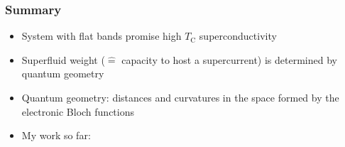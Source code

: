 \documentclass[aspectratio=169]{beamer}
\begin{document}

\begin{frame}
	\frametitle{Summary}
	
	\begin{itemize}
		\item System with flat bands promise high \(T_{\mathrm{C}}\) superconductivity\pause
		\item Superfluid weight (\(\hat{=}\) capacity to host a supercurrent) is determined by quantum geometry\pause
		\item Quantum geometry: distances and curvatures in the space formed by the electronic Bloch functions\pause
		\item My work so far: 
	\end{itemize}	
\end{frame}

	
	
	
	
	
\end{document}
